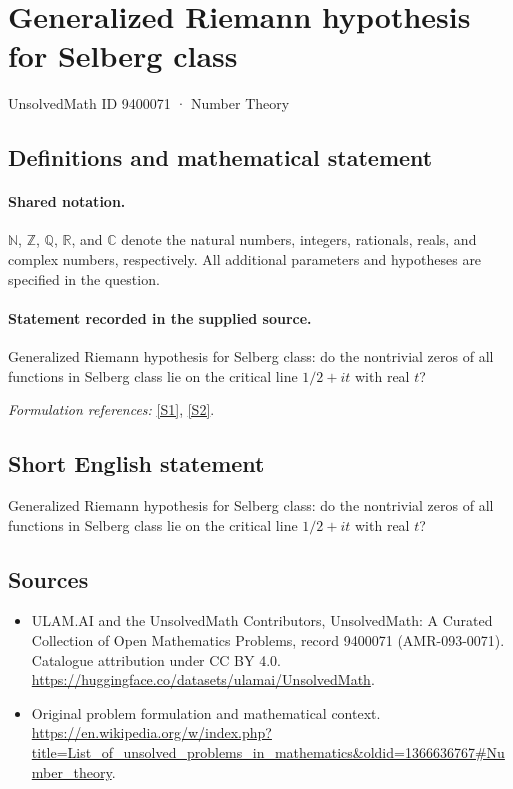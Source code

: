 \documentclass[11pt]{article}
\newcommand{\sref}[2]{\hyperlink{source:#1:#2}{[S#2]}}
\begin{document}
\setcounter{section}{9400070}
\section{Generalized Riemann hypothesis for Selberg class}\label{9400071}
{\small UnsolvedMath ID 9400071 · Number Theory}
\subsection{Definitions and mathematical statement}

\paragraph{Shared notation.}$\mathbb N$, $\mathbb Z$, $\mathbb Q$, $\mathbb R$, and $\mathbb C$ denote the natural numbers, integers, rationals, reals, and complex numbers, respectively. All additional parameters and hypotheses are specified in the question.


\paragraph{Statement recorded in the supplied source.}
Generalized Riemann hypothesis for Selberg class: do the nontrivial zeros of all functions in Selberg class lie on the critical line $1/2 + it$ with real $t$?
\par\smallskip\textit{Formulation references:} \sref{9400071}{1}, \sref{9400071}{2}.
\subsection{Short English statement}
Generalized Riemann hypothesis for Selberg class: do the nontrivial zeros of all functions in Selberg class lie on the critical line $1/2 + it$ with real $t$?
\subsection{Sources}
\begin{itemize}
\item[\hypertarget{source:9400071:1}{S1}] ULAM.AI and the UnsolvedMath Contributors, UnsolvedMath: A Curated Collection of Open Mathematics Problems, record 9400071 (AMR-093-0071). Catalogue attribution under CC BY 4.0.
\url{https://huggingface.co/datasets/ulamai/UnsolvedMath}.
\item[\hypertarget{source:9400071:2}{S2}] Original problem formulation and mathematical context.
\url{https://en.wikipedia.org/w/index.php?title=List_of_unsolved_problems_in_mathematics&oldid=1366636767#Number_theory}.
\end{itemize}
\label{end:9400071}
\end{document}
